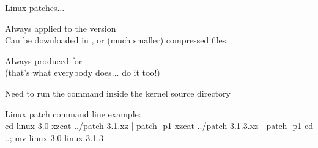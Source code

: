   Linux patches...
  \startitemize
  \item Always applied to the  version\\
    Can be downloaded in ,  or  (much
    smaller) compressed files.
  \item Always produced for \\
    (that's what everybody does... do it too!)
  \item Need to run the  command inside the kernel source
    directory
  \item Linux patch command line example:\\
\starttyping
cd linux-3.0
xzcat ../patch-3.1.xz | patch -p1
xzcat ../patch-3.1.3.xz | patch -p1
cd ..; mv linux-3.0 linux-3.1.3
\stoptyping
  \stopitemize
